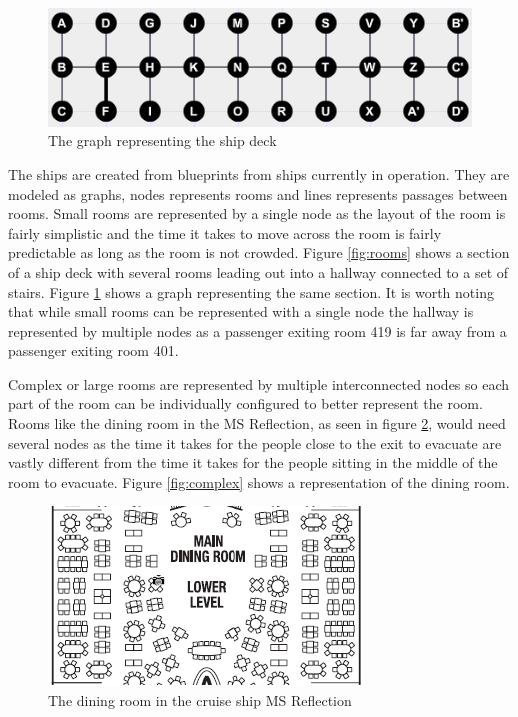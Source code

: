 \begin{figure} [h]
\centering
\includegraphics{images/simple.png}
\caption{The graph representing the ship deck}
\label{fig:simple}
\end{figure}

The ships are created from blueprints from ships currently in operation. They are modeled as graphs, nodes represents rooms and lines represents passages between rooms. Small rooms are represented by a single node as the layout of the room is fairly simplistic and the time it takes to move across the room is fairly predictable as long as the room is not crowded. Figure \ref{fig:rooms} shows a section of a ship deck with several rooms leading out into a hallway connected to a set of stairs. Figure \ref{fig:simple} shows a graph representing the same section. It is worth noting that while small rooms can be represented with a single node the hallway is represented by multiple nodes as a passenger exiting room 419 is far away from a passenger exiting room 401.

Complex or large rooms are represented by multiple interconnected nodes so each part of the room can be individually configured to better represent the room. Rooms like the dining room in the MS Reflection, as seen in figure \ref{fig:dining}, would need several nodes as the time it takes for the people close to the exit to evacuate are vastly different from the time it takes for the people sitting in the middle of the room to evacuate. Figure \ref{fig:complex} shows a representation of the dining room. 

\begin{figure} [h]
\centering
\includegraphics{images/Dining.png}
\caption{The dining room in the cruise ship MS Reflection}
\label{fig:dining}
\end{figure}

